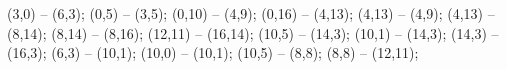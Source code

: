    (3,0) -- (6,3);
   (0,5) -- (3,5);
   (0,10) -- (4,9);
   (0,16) -- (4,13);
   (4,13) -- (4,9);
   (4,13) -- (8,14);
   (8,14) -- (8,16);
   (12,11) -- (16,14);
   (10,5) -- (14,3);
   (10,1) -- (14,3);
   (14,3) -- (16,3);
   (6,3) -- (10,1);
   (10,0) -- (10,1);
   (10,5) -- (8,8);
   (8,8) -- (12,11);

